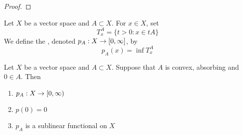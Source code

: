 \documentclass{book}
\begin{document}
	\begin{proof}
		
	\end{proof}

	\begin{defn}
		Let $X$ be a vector space and $A \subset X$. For $x \in X$, set $$T^A_x = \{t > 0: x \in tA\}$$ We define the , denoted $p_A: X \rightarrow [0,\infty]$, by $$p_A(x) = \inf T^A_x$$ 
	\end{defn}

	\begin{ex}
		Let $X$ be a vector space and $A \subset X$. Suppose that $A$ is convex, absorbing and $0 \in A$. Then 
		\begin{enumerate}
			\item $p_A:X \rightarrow [0,\infty)$ 
			\item $p(0) = 0$
			\item $p_A$ is a sublinear functional on $X$
		\end{enumerate}
	\end{ex}
\end{document}
